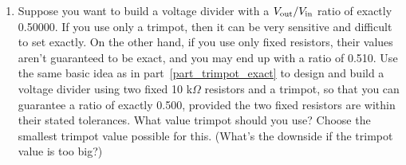 \begin{enumerate}[wide]
\item Suppose you want to build a voltage divider with a $V_{\rm out}/V_{\rm in}$ ratio of exactly 0.50000.  If you use only a trimpot, then it can be very sensitive and difficult to set exactly.  On the other hand, if you use only fixed resistors, their values aren't guaranteed to be exact, and you may end up with a ratio of 0.510.  Use the same basic idea as in part~\ref{part_trimpot_exact} to design and build a voltage divider using two fixed 10 k$\Omega$ resistors and a trimpot, so that you can guarantee a ratio of exactly 0.500, provided the two fixed resistors are within their stated tolerances.  What value trimpot should you use?  Choose the smallest trimpot value possible for this.  (What's the downside if the trimpot value is too big?)  


\end{enumerate}

